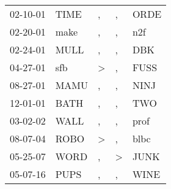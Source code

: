 \begin{supertabular}{lllll}
 02-10-01 &  TIME &             , &             , &  ORDE \\
 02-20-01 &  make &             , &             , &   n2f \\
 02-24-01 &  MULL &             , &             , &   DBK \\
 04-27-01 &   sfb &  \textgreater &             , &  FUSS \\
 08-27-01 &  MAMU &             , &             , &  NINJ \\
 12-01-01 &  BATH &             , &             , &   TWO \\
 03-02-02 &  WALL &             , &             , &  prof \\
 08-07-04 &  ROBO &  \textgreater &             , &  blbc \\
 05-25-07 &  WORD &             , &  \textgreater &  JUNK \\
 05-07-16 &  PUPS &             , &             , &  WINE \\
\end{supertabular}
